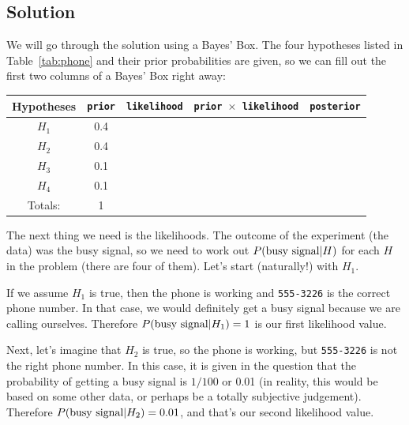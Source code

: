 \subsection{Solution}
We will go through the solution using a Bayes' Box. The four hypotheses listed
in Table~\ref{tab:phone} and their prior probabilities are given, so we can fill
out the first two columns of a Bayes' Box right away:
\begin{table}[!ht]
\begin{center}
\begin{tabular}{|c|c|c|c|c|}
\hline
{\bf Hypotheses} & {\tt prior} & {\tt likelihood} &
{\tt prior $\times$ likelihood} & {\tt posterior}\\
\hline
$H_1$ & 0.4 &  &  & \\
$H_2$ & 0.4 &  &  & \\
$H_3$ & 0.1 &  &  & \\
$H_4$ & 0.1 &  &  & \\
\hline
Totals: & 1 & & & \\
\hline
\end{tabular}
\end{center}
\end{table}
The next thing we need is the likelihoods. The outcome of the experiment (the
data) was the busy signal, so we need to work out $P(\textnormal{busy signal} | H)$ for each $H$
in the problem (there are four of them). Let's start (naturally!) with $H_1$.

If we assume $H_1$ is true, then the phone is working and {\tt 555-3226} is the
correct phone number. In that case, we would definitely get a busy signal
because we are calling ourselves. Therefore
$P(\textnormal{busy signal} | H_1) = 1$ is our first likelihood value.

Next, let's imagine that $H_2$ is true, so the phone is working, but
{\tt 555-3226} is not the right phone number. In this case, it is given in the
question that the probability of getting a busy signal is $1/100$ or 0.01 (in
reality, this would be based on some other data, or perhaps be a totally
subjective judgement).
Therefore $P(\textnormal{busy signal} | H_2) = 0.01$, and that's our second
likelihood value.

